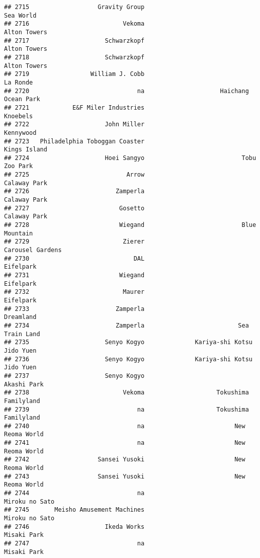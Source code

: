 \documentclass[
]{article}
\begin{document}
\begin{verbatim}
## 2715                   Gravity Group                               Sea World
## 2716                          Vekoma                            Alton Towers
## 2717                     Schwarzkopf                            Alton Towers
## 2718                     Schwarzkopf                            Alton Towers
## 2719                 William J. Cobb                                La Ronde
## 2720                              na                     Haichang Ocean Park
## 2721            E&F Miler Industries                                Knoebels
## 2722                     John Miller                               Kennywood
## 2723   Philadelphia Toboggan Coaster                            Kings Island
## 2724                     Hoei Sangyo                           Tobu Zoo Park
## 2725                           Arrow                            Calaway Park
## 2726                        Zamperla                            Calaway Park
## 2727                         Gosetto                            Calaway Park
## 2728                         Wiegand                           Blue Mountain
## 2729                          Zierer                        Carousel Gardens
## 2730                             DAL                               Eifelpark
## 2731                         Wiegand                               Eifelpark
## 2732                          Maurer                               Eifelpark
## 2733                        Zamperla                               Dreamland
## 2734                        Zamperla                          Sea Train Land
## 2735                     Senyo Kogyo              Kariya-shi Kotsu Jido Yuen
## 2736                     Senyo Kogyo              Kariya-shi Kotsu Jido Yuen
## 2737                     Senyo Kogyo                             Akashi Park
## 2738                          Vekoma                    Tokushima Familyland
## 2739                              na                    Tokushima Familyland
## 2740                              na                         New Reoma World
## 2741                              na                         New Reoma World
## 2742                   Sansei Yusoki                         New Reoma World
## 2743                   Sansei Yusoki                         New Reoma World
## 2744                              na                          Miroku no Sato
## 2745       Meisho Amusement Machines                          Miroku no Sato
## 2746                     Ikeda Works                             Misaki Park
## 2747                              na                             Misaki Park

\end{verbatim}
\end{document}
